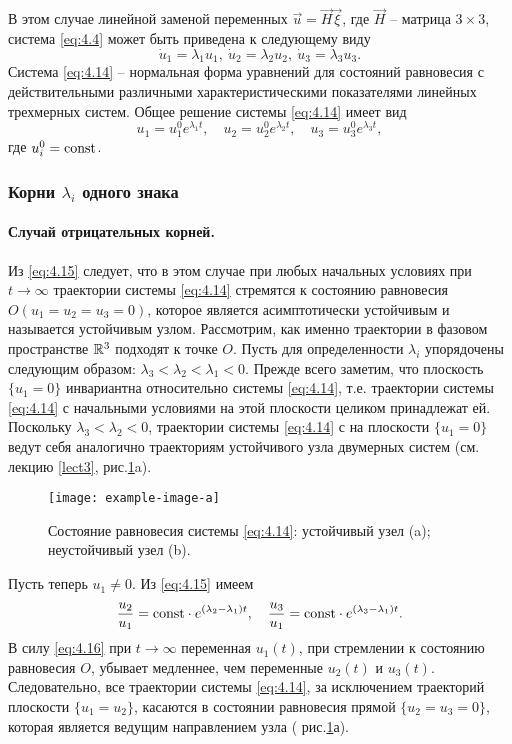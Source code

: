 В этом случае линейной заменой переменных $\vec u = \vec H \vec \xi$, где $\vec H$ -- матрица $3 \times 3$, система \eqref{eq:4.4} может быть приведена к следующему виду
\begin{equation}
        \label{eq:4.14}
        \dot u_1 = \lambda_1 u_1, ~ \dot u_2 = \lambda_2 u_2,~ \dot u_3 = \lambda_3 u_3.
\end{equation}
Система \eqref{eq:4.14} -- нормальная форма уравнений для состояний равновесия с действительными различными характеристическими показателями линейных трехмерных систем. Общее решение системы \eqref{eq:4.14} имеет вид 
\begin{equation}
        \label{eq:4.15}
        u_1 = u_1^{0} e^{\lambda_1 t}, \quad u_2=u_2^{0} e^{\lambda_2t}, \quad u_3 = u_3^{0} e^{\lambda_3 t},
\end{equation}
где $u_i^0=\textrm{const}$.

\subsubsection{Корни $\lambda_i $ одного знака}%
\label{ssub:4.4.1a}

\paragraph{Случай отрицательных корней.}%
\label{par:sluchai_otritsatel_nykh_kornei_}

Из \eqref{eq:4.15} следует, что в этом случае при любых начальных условиях при $t \to \infty$ траектории системы \eqref{eq:4.14} стремятся к состоянию равновесия $O (u_1=u_2=u_3=0)$, которое является асимптотически устойчивым и называется устойчивым узлом. Рассмотрим, как именно траектории в фазовом пространстве $\mathbb{R}^3$ подходят к точке $O$. Пусть для определенности $\lambda_i$ упорядочены следующим образом: $\lambda_3< \lambda_2< \lambda_1<0$. Прежде всего заметим,
что плоскость $\{ u_1 =0 \}$ инвариантна относительно системы \eqref{eq:4.14}, т.е. траектории системы \eqref{eq:4.14} с начальными условиями на этой плоскости целиком принадлежат ей. 
Поскольку $\lambda_3< \lambda_2<0$, траектории системы \eqref{eq:4.14} с на плоскости $\{ u_1 =0\}$   ведут себя аналогично траекториям устойчивого узла двумерных систем (см. лекцию \ref{lect3}, рис.\ref{fig:4.2}a). 
\begin{figure}[h!]
        \centering
        \texttt{[image: example-image-a]}
        \caption{Состояние равновесия системы \eqref{eq:4.14}: устойчивый узел (a); неустойчивый узел (b). }
        \label{fig:4.2}
\end{figure}
Пусть теперь $u_1 \neq 0$. Из \eqref{eq:4.15} имеем
\begin{equation}
        \label{eq:4.16}
        \frac{u_{2}}{u_1} = \textrm{const} \cdot e^{(\lambda_2-\lambda_1) t}, \quad \frac{u_3}{u_1}=\textrm{const} \cdot e^{(\lambda_3 - \lambda_1) t}.
\end{equation}
В силу \eqref{eq:4.16} при $t \to \infty$ переменная $u_1 (t)$, при стремлении к состоянию равновесия $O$, убывает медленнее, чем переменные $u_2(t)$ и $u_3(t)$.
Следовательно, все траектории системы \eqref{eq:4.14}, за исключением траекторий плоскости $\{ u_1=u_2\}$, касаются в состоянии равновесия прямой $\{ u_2 = u_3 = 0 \}$, которая является ведущим направлением узла ( рис.\ref{fig:4.2}а).
